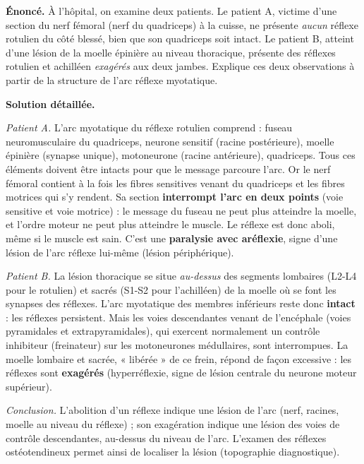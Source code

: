 \documentclass[11pt]{article}
\begin{document}
\begin{exoresolu}
\textbf{Énoncé.} À l'hôpital, on examine deux patients. Le patient A, victime d'une section du nerf fémoral (nerf du quadriceps) à la cuisse, ne présente \emph{aucun} réflexe rotulien du côté blessé, bien que son quadriceps soit intact. Le patient B, atteint d'une lésion de la moelle épinière au niveau thoracique, présente des réflexes rotulien et achilléen \emph{exagérés} aux deux jambes. Explique ces deux observations à partir de la structure de l'arc réflexe myotatique.

\tcblower
\textbf{Solution détaillée.}

\emph{Patient A.} L'arc myotatique du réflexe rotulien comprend : fuseau neuromusculaire du quadriceps, neurone sensitif (racine postérieure), moelle épinière (synapse unique), motoneurone (racine antérieure), quadriceps. Tous ces éléments doivent être intacts pour que le message parcoure l'arc. Or le nerf fémoral contient à la fois les fibres sensitives venant du quadriceps et les fibres motrices qui s'y rendent. Sa section \textbf{interrompt l'arc en deux points} (voie sensitive et voie motrice) : le message du fuseau ne peut plus atteindre la moelle, et l'ordre moteur ne peut plus atteindre le muscle. Le réflexe est donc aboli, même si le muscle est sain. C'est une \textbf{paralysie avec aréflexie}, signe d'une lésion de l'arc réflexe lui-même (lésion périphérique).

\emph{Patient B.} La lésion thoracique se situe \emph{au-dessus} des segments lombaires (L2-L4 pour le rotulien) et sacrés (S1-S2 pour l'achilléen) de la moelle où se font les synapses des réflexes. L'arc myotatique des membres inférieurs reste donc \textbf{intact} : les réflexes persistent. Mais les voies descendantes venant de l'encéphale (voies pyramidales et extrapyramidales), qui exercent normalement un contrôle inhibiteur (freinateur) sur les motoneurones médullaires, sont interrompues. La moelle lombaire et sacrée, « libérée » de ce frein, répond de façon excessive : les réflexes sont \textbf{exagérés} (hyperréflexie, signe de lésion centrale du neurone moteur supérieur).

\emph{Conclusion.} L'abolition d'un réflexe indique une lésion de l'arc (nerf, racines, moelle au niveau du réflexe) ; son exagération indique une lésion des voies de contrôle descendantes, au-dessus du niveau de l'arc. L'examen des réflexes ostéotendineux permet ainsi de localiser la lésion (topographie diagnostique).
\end{exoresolu}
\end{document}
